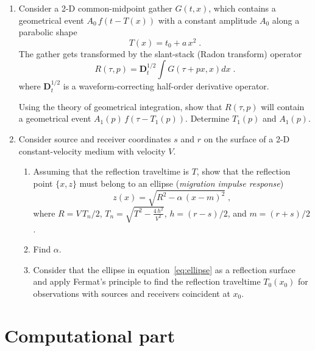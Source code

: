 \begin{enumerate}
\item Consider a 2-D common-midpoint gather $G(t,x)$, which
  contains a geometrical event $A_0\,f\left(t-T(x)\right)$ with a
  constant amplitude $A_0$ along a parabolic shape
\begin{equation}
\label{eq:hyper}
T(x) = t_0+a\,x^2\;.
\end{equation}
The gather gets transformed by the slant-stack (Radon transform) operator
\begin{equation}
\label{eq:radon}
R(\tau,p) = \mathbf{D}_t^{1/2} \int G(\tau + p x, x) d x\;.
\end{equation}
where $ \mathbf{D}_t^{1/2}$ is a waveform-correcting half-order
derivative operator.

Using the theory of geometrical integration, show that $R(\tau,p)$
will contain a geometrical event $A_1(p)\,f\left(\tau-T_1(p)\right)$.
Determine $T_1(p)$ and $A_1(p)$.
\item Consider source and receiver coordinates $s$ and $r$ on the
  surface of a 2-D constant-velocity medium with velocity
  $V$. 

  \begin{enumerate}
  \item Assuming that the reflection traveltime is $T$, show that the
    reflection point $\{x,z\}$ must belong to an ellipse (\emph{migration
      impulse response})
    \begin{equation}
      \label{eq:ellipse}
      z(x) = \sqrt{R^2 - \alpha\,(x-m)^2}\;,
    \end{equation}
    where $R=V\,T_n/2$, $T_n=\sqrt{T^2-\frac{4\,h^2}{V^2}}$, $h=(r-s)/2$, and $m=(r+s)/2$.
  \item Find $\alpha$.
  \item Consider that the ellipse in equation~\ref{eq:ellipse} as a
    reflection surface and apply Fermat's principle to find the reflection
    traveltime $T_0(x_0)$ for observations with sources and receivers coincident at $x_0$.
  \end{enumerate}

\end{enumerate}

\section{Computational part}

